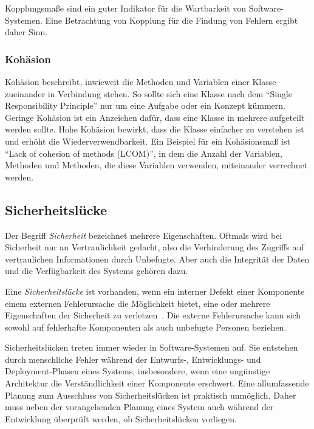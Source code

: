 Kopplungsmaße sind ein guter Indikator für die Wartbarkeit von Software-Systemen.
Eine Betrachtung von Kopplung für die Findung von Fehlern ergibt daher Sinn.

\subsubsection{Kohäsion}
Kohäsion beschreibt, inwieweit die Methoden und Variablen einer Klasse zueinander in Verbindung stehen.
So sollte sich eine Klasse nach dem "`Single Responsibility Principle"' nur um eine Aufgabe oder ein Konzept kümmern.
Geringe Kohäsion ist ein Anzeichen dafür, dass eine Klasse in mehrere aufgeteilt werden sollte.
Hohe Kohäsion bewirkt, dass die Klasse einfacher zu verstehen ist und erhöht die Wiederverwendbarkeit.
Ein Beispiel für ein Kohäsionsmaß ist "`Lack of cohesion of methods (LCOM)"', in dem die Anzahl der Variablen, Methoden und Methoden, die diese Variablen verwenden, miteinander verrechnet werden.

\subsection{Sicherheitslücke}
Der Begriff \emph{Sicherheit} bezeichnet mehrere Eigenschaften.
Oftmals wird bei Sicherheit nur an Vertraulichkeit gedacht, also die Verhinderung des Zugriffs auf vertraulichen Informationen durch Unbefugte.
Aber auch die Integrität der Daten und die Verfügbarkeit des Systems gehören dazu.

Eine \emph{Sicherheitslücke} ist vorhanden, wenn ein interner Defekt einer Komponente einem externen Fehlerursache die Möglichkeit bietet, eine oder mehrere Eigenschaften der Sicherheit zu verletzen~\cite{basics}.
Die externe Fehlerursache kann sich sowohl auf fehlerhafte Komponenten als auch unbefugte Personen beziehen.

Sicherheitslücken treten immer wieder in Software-Systemen auf.
Sie entstehen durch menschliche Fehler während der Entwurfs-, Entwicklungs- und Deployment-Phasen eines Systems, insbesondere, wenn eine ungünstige Architektur die Verständlichkeit einer Komponente erschwert.
Eine allumfassende Planung zum Ausschluss von Sicherheitslücken ist praktisch unmöglich.
Daher muss neben der vorangehenden Planung eines System auch während der Entwicklung überprüft werden, ob Sicherheitslücken vorliegen.
